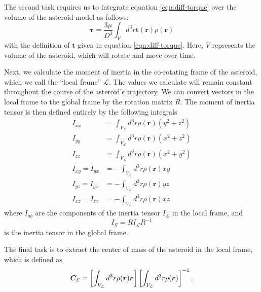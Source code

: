 \documentclass[aps,twocolumn,secnumarabic,balancelastpage,amsmath,amssymb,nofootinbib,floatfix]{revtex4-1}
\begin{document}
The second task requires us to integrate equation \ref{eqn:diff-torque} over the volume of the asteroid model as follows:
\begin{equation}
    \bm{\tau} =  \frac{3\mu}{D^3}\int_{V} d^3 r \bm{t}(\bm{r}) \rho(\bm r)
    \label{eqn:total-torque}
\end{equation}
with the definition of $\bm{t}$ given in equation \ref{eqn:diff-torque}. Here, $V$ represents the volume of the asteroid, which will rotate and move over time.

Next, we calculate the moment of inertia in the co-rotating frame of the asteroid, which we call the ``local frame'' $\mathcal{L}$. The values we calculate will remain constant throughout the course of the asteroid's trajectory. We can convert vectors in the local frame to the global frame by the rotation matrix $R$. The moment of inertia tensor is then defined entirely by the following integrals
\begin{equation}
\begin{aligned}
    I_{xx} &= \int_{V_\mathcal{L}} d^3 r  \rho(\bm r) (y^2 + z^2) \\
    I_{yy} &= \int_{V_\mathcal{L}} d^3 r  \rho(\bm r) (x^2 + z^2) \\
    I_{zz} &= \int_{V_\mathcal{L}} d^3 r  \rho(\bm r) (x^2 + y^2) \\
    I_{xy}=I_{yx} &= -\int_{V_\mathcal{L}} d^3r \rho(\bm r) xy \\
    I_{yz}=I_{yx} &= -\int_{V_\mathcal{L}} d^3r \rho(\bm r) yz\\
    I_{xz}=I_{zx} &= -\int_{V_\mathcal{L}} d^3r \rho(\bm r) xz
    \label{eqn:moi-local}
\end{aligned}
\end{equation}
where $I_{ab}$ are the components of the inertia tensor $I_\mathcal{L}$ in the local frame, and
\begin{equation}
    I_\mathcal{G} = R I_\mathcal{L} R^{-1}
    \label{eqn:moi-global}
\end{equation}
is the inertia tensor in the global frame.

The final task is to extract the center of mass of the asteroid in the local frame, which is defined as
\begin{equation}
    \bm C_\mathcal{L} = \left[ \int_{V_\mathcal{L}} d^3 r \rho(\bm r)\bm r \right]\left[ \int_{V_\mathcal{L}} d^3 r \rho(\bm r) \right]^{-1}.
    \label{eqn:com}
\end{equation}
\end{document}

